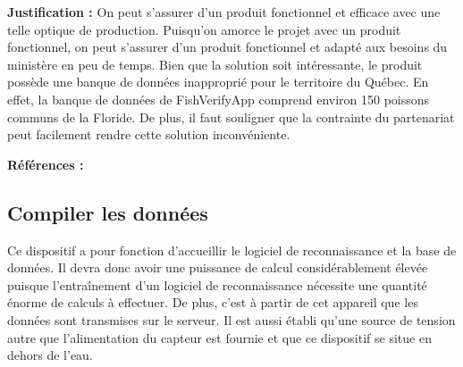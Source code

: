 \textbf{Justification :} On peut s’assurer d’un produit fonctionnel et efficace avec une telle optique de production. Puisqu’on amorce le projet avec un produit fonctionnel, on peut s’assurer d’un produit fonctionnel et adapté aux besoins du ministère en peu de temps. Bien que la solution soit intéressante, le produit possède une banque de données inapproprié pour le territoire du Québec. En effet, la banque de données de FishVerifyApp comprend environ 150 poissons communs de la Floride. De plus, il faut souligner que la contrainte du partenariat peut facilement rendre cette solution inconvéniente.


\textbf{Références :} \cite{fishverify}


\begin{table}[!htb]
\footnotesize
\centering
{}
\caption{Faisabilité des concepts pour identifier les poissons et compiler les données}
\label{t:Decision_identifier}
\end{table}


\subsection{Compiler les données}
Ce dispositif a pour fonction d'accueillir le logiciel de reconnaissance et la base de données. Il devra donc avoir une puissance de calcul considérablement élevée puisque l'entraînement d'un logiciel de reconnaissance nécessite une quantité énorme de calculs à effectuer. De plus, c'est à partir de cet appareil que les données sont transmises sur le serveur. Il est aussi établi qu'une source de tension autre que l'alimentation du capteur est fournie et que ce dispositif se situe en dehors de l'eau.

